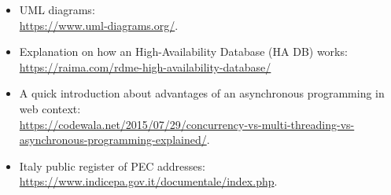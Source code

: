 \begin{itemize}
	\item UML diagrams:\\ \url{https://www.uml‐diagrams.org/}.
	\item Explanation on how an High-Availability Database (HA DB) works:\\
	\url{https://raima.com/rdme-high-availability-database/}
	\item A quick introduction about advantages of an asynchronous programming in web context:\\ \url{https://codewala.net/2015/07/29/concurrency-vs-multi-threading-vs-asynchronous-programming-explained/}.
	\item Italy public register of PEC addresses:\\
	\url{https://www.indicepa.gov.it/documentale/index.php}.
\end{itemize}